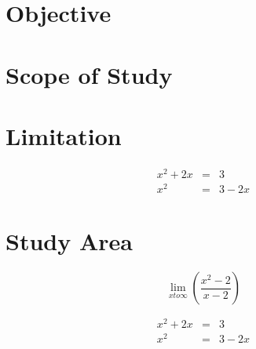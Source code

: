 \documentclass[12pt]{report} %
\begin{document}
    \section{Objective}
    \section{Scope of Study}
    \section{Limitation}


     \begin{eqnarray}
        x^2+2x&=&3 \nonumber\\
        x^2 &=&3-2x \nonumber
    \end{eqnarray}
    
    \section{Study Area}
    
    \begin{equation}
        \lim_{x to \infty}\left(\dfrac{x^2-2}{x-2}\right)
    \end{equation}

    \begin{eqnarray}
        x^2+2x&=&3 \\
        x^2 &=&3-2x
    \end{eqnarray}
\end{document}

